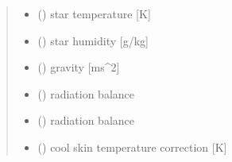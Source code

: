 \documentclass[letterpaper,10pt,english]{sphinxmanual}
\begin{document}
\begin{fulllineitems}
\begin{quote}
\begin{description}
\begin{itemize}
\item {}
\sphinxAtStartPar
{} () \textendash{} star temperature              {[}K{]}

\item {}
\sphinxAtStartPar
{} () \textendash{} star humidity                 {[}g/kg{]}

\item {}
\sphinxAtStartPar
{} () \textendash{} gravity                      {[}ms\textasciicircum{}\sphinxhyphen{}2{]}

\item {}
\sphinxAtStartPar
{} () \textendash{} radiation balance

\end{itemize}

\sphinxAtStartPar
\begin{itemize}
\item {}
\sphinxAtStartPar
{} () \textendash{} radiation balance

\item {}
\sphinxAtStartPar
{} () \textendash{} cool skin temperature correction {[}K{]}

\end{itemize}


\end{description}\end{quote}

\end{fulllineitems}

\end{document}
